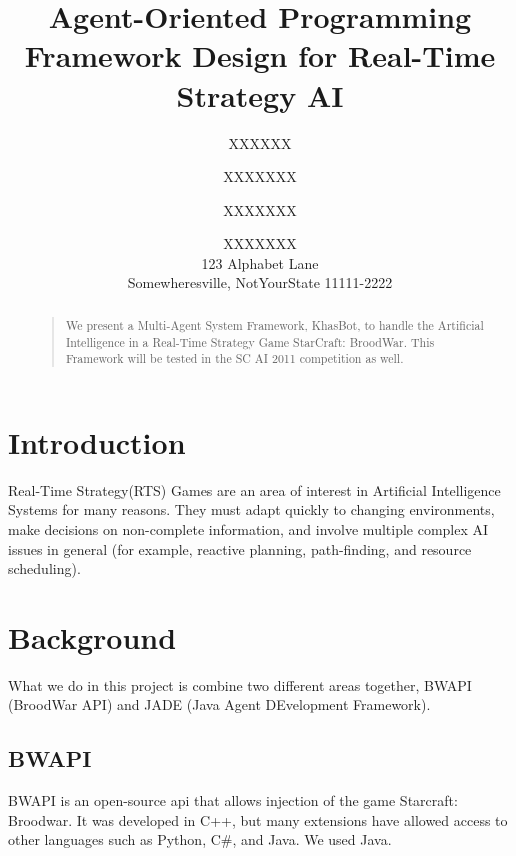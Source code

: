 \documentclass[letterpaper]{article}
\begin{document}
%
\title{Agent-Oriented Programming Framework Design for Real-Time Strategy AI}


\author{XXXXXX \and XXXXXXX \and XXXXXXX \and XXXXXXX \\
123 Alphabet Lane \\  Somewheresville, NotYourState 11111-2222
}

\maketitle
\begin{abstract}
\begin{quote}
We present a Multi-Agent System Framework, KhasBot, to handle the Artificial Intelligence in a Real-Time Strategy Game StarCraft: BroodWar.  This Framework will be tested in the SC AI 2011 competition as well.
\end{quote}
\end{abstract}

\section{Introduction}
Real-Time Strategy(RTS) Games are an area of  interest in Artificial Intelligence Systems for many reasons.  They must adapt quickly to changing environments, make decisions on non-complete information, and involve multiple complex AI issues in general (for example, reactive planning, path-finding, and resource scheduling).

\section{Background}
What we do in this project is combine two different areas together, BWAPI (BroodWar API) and JADE (Java Agent DEvelopment Framework).

\subsection{BWAPI}
BWAPI is an open-source api that allows injection of the game Starcraft: Broodwar.  It was developed in C++, but many extensions have allowed access to other languages such as Python, C\#, and Java.  We used Java.
\end{document}
